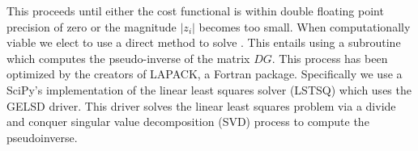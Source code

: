 This proceeds until either the cost functional is within double floating
point precision of zero or the magnitude $|z_i|$ becomes too small.
When computationally viable we elect to use a direct method to solve
. This entails using a subroutine
which computes the pseudo-inverse of the matrix $DG$. This process
has been optimized by the creators of LAPACK, a Fortran package.
Specifically we use a SciPy's implementation of the linear least
squares solver (LSTSQ) which uses the GELSD driver. This driver solves
the linear least squares problem via a divide and conquer
singular value decomposition (SVD) process to compute
the pseudoinverse.


